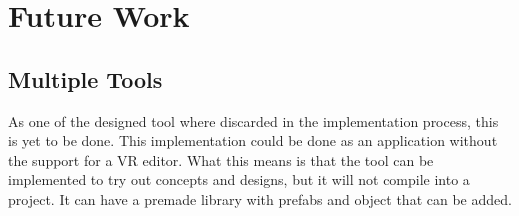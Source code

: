 \chapter{Future Work}
\section{Multiple Tools}
As one of the designed tool where discarded in the implementation process, this is yet to be done. This implementation could be done as an application without the support for a VR editor. What this means is that the tool can be implemented to try out concepts and designs, but it will not compile into a project. It can have a premade library with prefabs and object that can be added.
